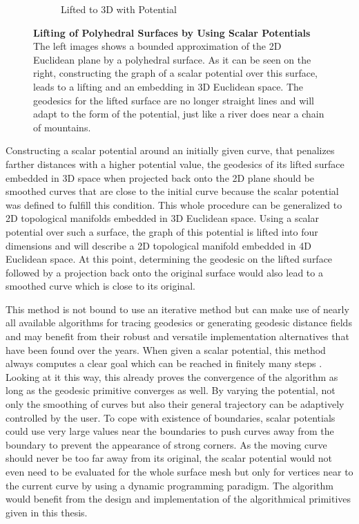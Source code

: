 \documentclass[crop=false]{stdlocal}
\begin{document}
\begin{figure}[H]
\begin{subfigure}[c]{0.4\linewidth}
      \caption{Lifted to 3D with Potential}
      \label{fig:lifting-lifted}
    \end{subfigure}
    \caption[Lifting of Polyhedral Surfaces by Using Scalar Potentials]{%
      \textbf{Lifting of Polyhedral Surfaces by Using Scalar Potentials}\\
      The left images shows a bounded approximation of the 2D Euclidean plane by a polyhedral surface.
      As it can be seen on the right, constructing the graph of a scalar potential over this surface, leads to a lifting and an embedding in 3D Euclidean space.
      The geodesics for the lifted surface are no longer straight lines and will adapt to the form of the potential, just like a river does near a chain of mountains.
    }
    \label{fig:lifting}
  \end{figure}
  \noindent
  Constructing a scalar potential around an initially given curve, that penalizes farther distances with a higher potential value, the geodesics of its lifted surface embedded in 3D space when projected back onto the 2D plane should be smoothed curves that are close to the initial curve because the scalar potential was defined to fulfill this condition.
  This whole procedure can be generalized to 2D topological manifolds embedded in 3D Euclidean space.
  Using a scalar potential over such a surface, the graph of this potential is lifted into four dimensions and will describe a 2D topological manifold embedded in 4D Euclidean space.
  At this point, determining the geodesic on the lifted surface followed by a projection back onto the original surface would also lead to a smoothed curve which is close to its original.

  This method is not bound to use an iterative method but can make use of nearly all available algorithms for tracing geodesics or generating geodesic distance fields and may benefit from their robust and versatile implementation alternatives that have been found over the years.
  When given a scalar potential, this method always computes a clear goal which can be reached in finitely many steps \autocite{mancinelli2022,sharp2020}.
  Looking at it this way, this already proves the convergence of the algorithm as long as the geodesic primitive converges as well.
  By varying the potential, not only the smoothing of curves but also their general trajectory can be adaptively controlled by the user.
  To cope with existence of boundaries, scalar potentials could use very large values near the boundaries to push curves away from the boundary to prevent the appearance of strong corners.
  As the moving curve should never be too far away from its original, the scalar potential would not even need to be evaluated for the whole surface mesh but only for vertices near to the current curve by using a dynamic programming paradigm.
  The algorithm would benefit from the design and implementation of the algorithmical primitives given in this thesis.
\end{document}
